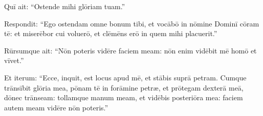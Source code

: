 Quī ait: ``Ostende mihi glōriam tuam.''

Respondit: ``Ego ostendam omne bonum tibi, et
vocābō in nōmine Dominī cōram tē: et miserēbor cui
voluerō, et clēmēns erō in quem mihi placuerit.''

Rūrsumque ait: ``Nōn poteris vidēre faciem meam: nōn enim
vidēbit mē homō et vīvet.'' 

Et iterum: ``Ecce, inquit, est locus apud mē,
et stābis suprā petram.
Cumque trānsībit
glōria mea, pōnam tē in forāmine petræ, et
prōtegam dexterā meā, dōnec trānseam: 
tollamque manum
meam, et vidēbis posteriōra mea: faciem autem meam vidēre nōn poteris.''

